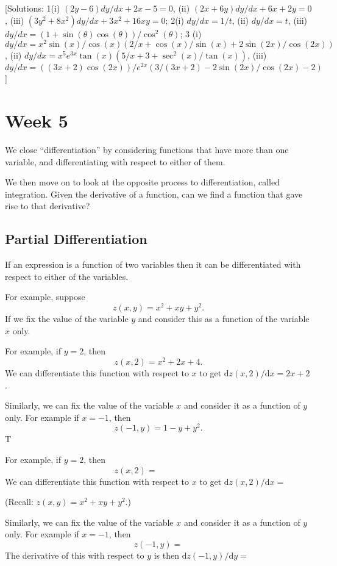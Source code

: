\documentclass[
  english,
  11pt,
  oneside]{book}
\newcommand{\slide}{}
\theoremstyle{definition}
\theoremstyle{definition}
\theoremstyle{definition}
\theoremstyle{definition}
\theoremstyle{remark}
\begin{document}
{[}Solutions: 1(i) \((2y-6)dy/dx+2x-5=0\), (ii) \((2x+6y)dy/dx+6x+2y=0\), (iii) \((3y^2+8x^2)dy/dx+3x^2+16xy=0\); 2(i) \(dy/dx = 1/t\), (ii) \(dy/dx = t\), (iii) \(dy/dx = (1+\sin(\theta)\cos(\theta))/\cos^2(\theta)\); 3 (i) \(dy/dx=x^2\sin(x)/\cos(x)\left(2/x+\cos(x)/\sin(x)+2\sin(2x)/\cos(2x)\right)\), (ii) \(dy/dx = x^5e^{3x}\tan(x)\left(5/x+3+\sec^2(x)/\tan(x)\right)\), (iii) \(dy/dx = ((3x+2)\cos(2x))/e^{2x}\left(3/(3x+2)-2\sin(2x)/\cos(2x)-2\right)\){]}

\chapter{Week 5}\label{week-five}

We close ``differentiation'' by considering functions that have more than one variable, and differentiating with respect to either of them.

We then move on to look at the opposite process to differentiation, called integration. Given the derivative of a function, can we find a function that gave rise to that derivative?

\slide

\section{Partial Differentiation}\label{partial-differentiation}

If an expression is a function of two variables then it can be differentiated with respect to either of the variables.

For example, suppose
\[
z(x,y) = x^2+xy+y^2.
\]
If we fix the value of the variable \(y\) and consider this as a function of the variable \(x\) only.

\begin{notslides}

For example, if \(y=2\), then
\[
z(x,2) = x^2 + 2x + 4.
\]
We can differentiate this function with respect to \(x\) to get \(\mathrm{d}z(x,2)/\mathrm{d}x = 2x+2\).

Similarly, we can fix the value of the variable \(x\) and consider it as a function of \(y\) only. For example if \(x=-1\), then
\[
z(-1,y) = 1-y+y^2.
\]
T

\end{notslides}

\begin{slidesonly}

For example, if \(y=2\), then
\[
z(x,2) = \phantom{x^2 + 2x + 4.}
\]
We can differentiate this function with respect to \(x\) to get \(\mathrm{d}z(x,2)/\mathrm{d}x =\)

\slide

(Recall: \(z(x,y) = x^2+xy+y^2\).)

Similarly, we can fix the value of the variable \(x\) and consider it as a function of \(y\) only. For example if \(x=-1\), then
\[
z(-1,y) =
\]
The derivative of this with respect to \(y\) is then \(\mathrm{d}z(-1,y)/\mathrm{d}y =\)

\slide

\end{slidesonly}
\end{document}
